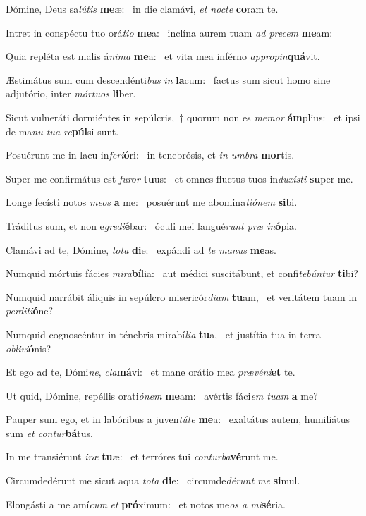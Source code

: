 \item Dómine, Deus sa\textit{lútis} \textbf{me}æ:~\psstar{} in die clamávi, \textit{et nocte} \textbf{co}ram te.
\item Intret in conspéctu tuo orá\textit{tio} \textbf{me}a:~\psstar{} inclína aurem tuam \textit{ad precem} \textbf{me}am:
\item Quia repléta est malis á\textit{nima} \textbf{me}a:~\psstar{} et vita mea inférno \textit{appropin}\textbf{quá}vit.
\item Æstimátus sum cum descendénti\textit{bus} \textit{in} \textbf{la}cum:~\psstar{} factus sum sicut homo sine adjutório, inter \textit{mórtuos} \textbf{li}ber.
\item Sicut vulneráti dormiéntes in sepúlcris,~† quorum non es \textit{memor} \textbf{ám}plius:~\psstar{} et ipsi de ma\textit{nu tua re}\textbf{púl}si sunt.
\item Posuérunt me in lacu in\textit{feri}\textbf{ó}ri:~\psstar{} in tenebrósis, et \textit{in umbra} \textbf{mor}tis.
\item Super me confirmátus est \textit{furor} \textbf{tu}us:~\psstar{} et omnes fluctus tuos in\textit{duxísti} \textbf{su}per me.
\item Longe fecísti notos \textit{meos} \textbf{a} me:~\psstar{} posuérunt me abomina\textit{tiónem} \textbf{si}bi.
\item Tráditus sum, et non e\textit{gredi}\textbf{é}bar:~\psstar{} óculi mei langué\textit{runt præ in}\textbf{ó}pia.
\item Clamávi ad te, Dómine, \textit{tota} \textbf{di}e:~\psstar{} expándi ad \textit{te manus} \textbf{me}as.
\item Numquid mórtuis fácies \textit{mira}\textbf{bí}lia:~\psstar{} aut médici suscitábunt, et confi\textit{tebúntur} \textbf{ti}bi?
\item Numquid narrábit áliquis in sepúlcro misericór\textit{diam} \textbf{tu}am,~\psstar{} et veritátem tuam in \textit{perditi}\textbf{ó}ne?
\item Numquid cognoscéntur in ténebris mirabí\textit{lia} \textbf{tu}a,~\psstar{} et justítia tua in terra \textit{oblivi}\textbf{ó}nis?
\item Et ego ad te, Dómi\textit{ne}, \textit{cla}\textbf{má}vi:~\psstar{} et mane orátio mea \textit{prævéni}\textbf{et} te.
\item Ut quid, Dómine, repéllis orati\textit{ónem} \textbf{me}am:~\psstar{} avértis fáci\textit{em tuam} \textbf{a} me?
\item Pauper sum ego, et in labóribus a juven\textit{túte} \textbf{me}a:~\psstar{} exaltátus autem, humiliátus sum \textit{et contur}\textbf{bá}tus.
\item In me transiérunt \textit{iræ} \textbf{tu}æ:~\psstar{} et terróres tui \textit{conturba}\textbf{vé}runt me.
\item Circumdedérunt me sicut aqua \textit{tota} \textbf{di}e:~\psstar{} circumde\textit{dérunt me} \textbf{si}mul.
\item Elongásti a me amí\textit{cum} \textit{et} \textbf{pró}ximum:~\psstar{} et notos me\textit{os a mi}\textbf{sé}ria.
